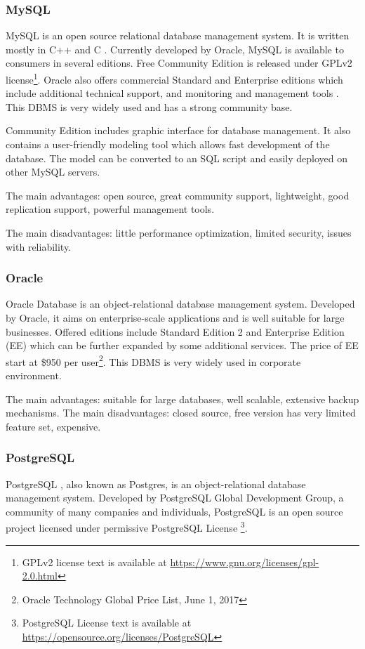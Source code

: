 		\subsubsection{MySQL}
		MySQL \cite{mysql} is an open source relational database management system. It is written mostly in C++ and C \cite{mysqllanguage}.  Currently developed by Oracle, MySQL is available to consumers in several editions. Free Community Edition is released under GPLv2 license\footnote{GPLv2 license text is available at \url{https://www.gnu.org/licenses/gpl-2.0.html}}. Oracle also offers commercial Standard and Enterprise editions which include additional technical support, and monitoring and management tools \cite{mysqleditions}. This DBMS is very widely used and has a strong community base. 
		
		Community Edition includes graphic interface for database management. It also contains a user-friendly modeling tool which allows fast development of the database. The model can be converted to an SQL script and easily deployed on other MySQL servers.
		
		The main advantages: open source, great community support, lightweight, good replication support, powerful management tools.
		
		The main disadvantages: little performance optimization, limited security,  issues with reliability.
		
		\subsubsection{Oracle}
		Oracle Database \cite{oracledb} is an object-relational database management system. Developed by Oracle, it aims on enterprise-scale applications and is well suitable for large businesses. Offered editions include Standard Edition 2 and Enterprise Edition (EE) which can be further expanded by some additional services. The price of EE start at \$950 per user\footnote{Oracle Technology Global Price List, June 1, 2017}. This DBMS is very widely used in corporate environment.
		
		The main advantages: suitable for large databases, well scalable, extensive backup mechanisms.
		The main disadvantages: closed source, free version has very limited feature set, expensive.
		 
		\subsubsection{PostgreSQL}
		PostgreSQL \cite{postgres}, also known as Postgres, is an object-relational database management system. Developed by PostgreSQL Global Development Group, a community of many companies and individuals, PostgreSQL is an open source project licensed under permissive PostgreSQL License \footnote{PostgreSQL License text is available at \url{https://opensource.org/licenses/PostgreSQL}}.
		
